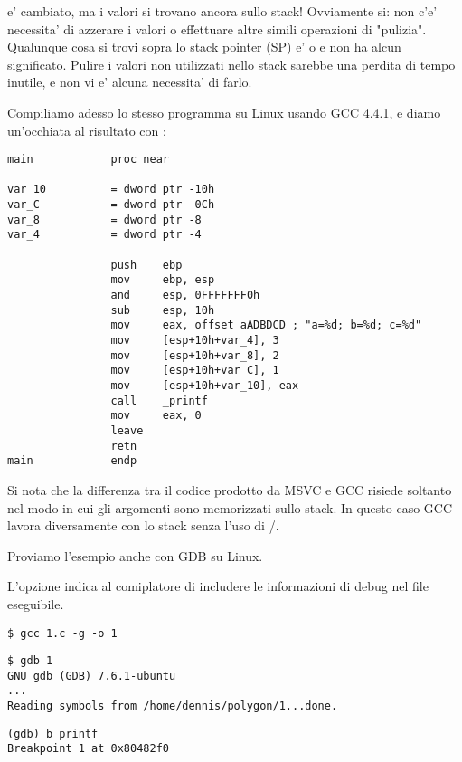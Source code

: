 \ESP e' cambiato, ma i valori si trovano ancora sullo stack!
Ovviamente si: non c'e' necessita' di azzerare i valori o effettuare altre simili operazioni di "pulizia".
Qualunque cosa si trovi sopra lo stack pointer (\ac{SP}) e'  o \IT{\garbage{}} e non ha alcun significato.
Pulire i valori non utilizzati nello stack sarebbe una perdita di tempo inutile, e non vi e' alcuna necessita' di farlo.


Compiliamo adesso lo stesso programma su Linux usando GCC 4.4.1, e diamo un'occhiata al risultato con \IDA:

\begin{lstlisting}[style=customasmx86]
main            proc near

var_10          = dword ptr -10h
var_C           = dword ptr -0Ch
var_8           = dword ptr -8
var_4           = dword ptr -4

                push    ebp
                mov     ebp, esp
                and     esp, 0FFFFFFF0h
                sub     esp, 10h
                mov     eax, offset aADBDCD ; "a=%d; b=%d; c=%d"
                mov     [esp+10h+var_4], 3
                mov     [esp+10h+var_8], 2
                mov     [esp+10h+var_C], 1
                mov     [esp+10h+var_10], eax
                call    _printf
                mov     eax, 0
                leave
                retn
main            endp
\end{lstlisting}

Si nota che la differenza tra il codice prodotto da MSVC e GCC risiede soltanto nel modo in cui gli argomenti sono memorizzati sullo stack.
In questo caso GCC lavora diversamente con lo stack senza l'uso di \PUSH/\POP.


Proviamo l'esempio anche con \ac{GDB} su Linux.

L'opzione  indica al comiplatore di includere le informazioni di debug nel file eseguibile.

\begin{lstlisting}
$ gcc 1.c -g -o 1
\end{lstlisting}

\begin{lstlisting}
$ gdb 1
GNU gdb (GDB) 7.6.1-ubuntu
...
Reading symbols from /home/dennis/polygon/1...done.
\end{lstlisting}

\begin{lstlisting}[caption=impostiamo un breakpoint su \printf]
(gdb) b printf
Breakpoint 1 at 0x80482f0
\end{lstlisting}

